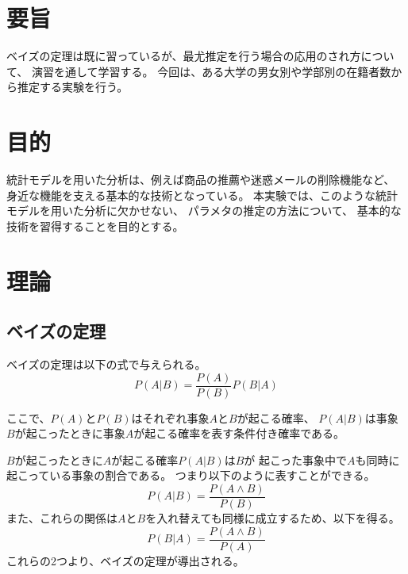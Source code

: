 \documentclass[12pt]{jarticle}
\begin{document}



\section{要旨}

ベイズの定理は既に習っているが、最尤推定を行う場合の応用のされ方について、
演習を通して学習する。
今回は、ある大学の男女別や学部別の在籍者数から推定する実験を行う。

\section{目的}
統計モデルを用いた分析は、例えば商品の推薦や迷惑メールの削除機能など、
身近な機能を支える基本的な技術となっている。
本実験では、このような統計モデルを用いた分析に欠かせない、
パラメタの推定の方法について、
基本的な技術を習得することを目的とする。

\section{理論}
\subsection{ベイズの定理}
ベイズの定理は以下の式で与えられる。
\begin{equation}
    P(A|B) = \frac{P(A)}{P(B)} P(B|A)
\end{equation}

ここで、$P(A)$と$P(B)$はそれぞれ事象$A$と$B$が起こる確率、
$P(A|B)$は事象$B$が起こったときに事象$A$が起こる確率を表す条件付き確率である。

$B$が起こったときに$A$が起こる確率$P(A|B)$は$B$が
起こった事象中で$A$も同時に起こっている事象の割合である。
つまり以下のように表すことができる。
\begin{equation}
    P(A|B) = \frac{P(A \land B)}{P(B)}
\end{equation}
また、これらの関係は$A$と$B$を入れ替えても同様に成立するため、以下を得る。
\begin{equation}
    P(B|A) = \frac{P(A \land B)}{P(A)}
\end{equation}
これらの2つより、ベイズの定理が導出される。
\end{document}
